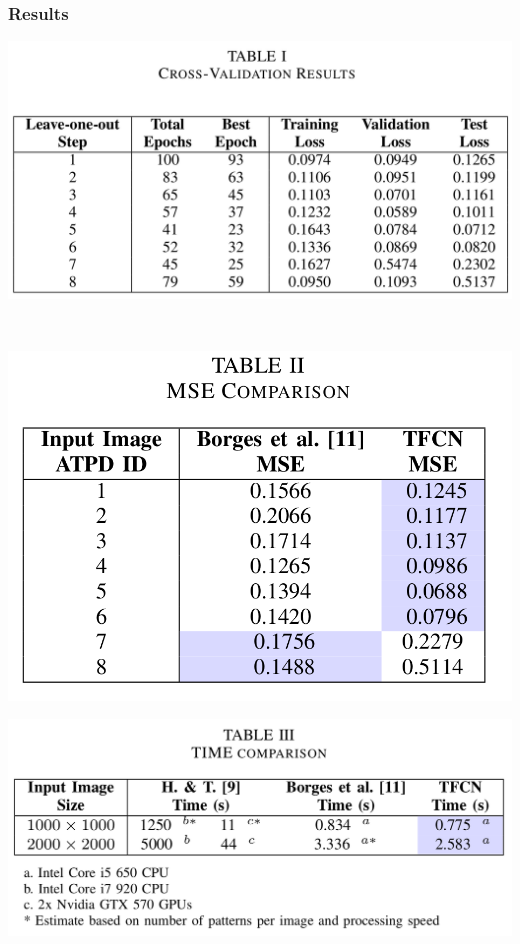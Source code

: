 \documentclass[usenames,dvipsnames,10pt]{beamer}
\begin{document}
\begin{frame}
\frametitle{Results}
\vspace{-1cm}
\begin{center}
\begin{minipage}[]{0.6\textwidth}
	\centering
	\includegraphics[width=\textwidth]{graphics/table_results.png}
\end{minipage} \\
\end{center}
\begin{minipage}[]{0.4\textwidth}
	\centering
	\includegraphics[width=\textwidth]{graphics/table_mse.png}
\end{minipage}
\hspace{0.25cm}
\begin{minipage}[]{0.55\textwidth}
	\centering
	\includegraphics[width=\textwidth]{graphics/table_time.png}
\end{minipage}
\end{frame}
\end{document}
